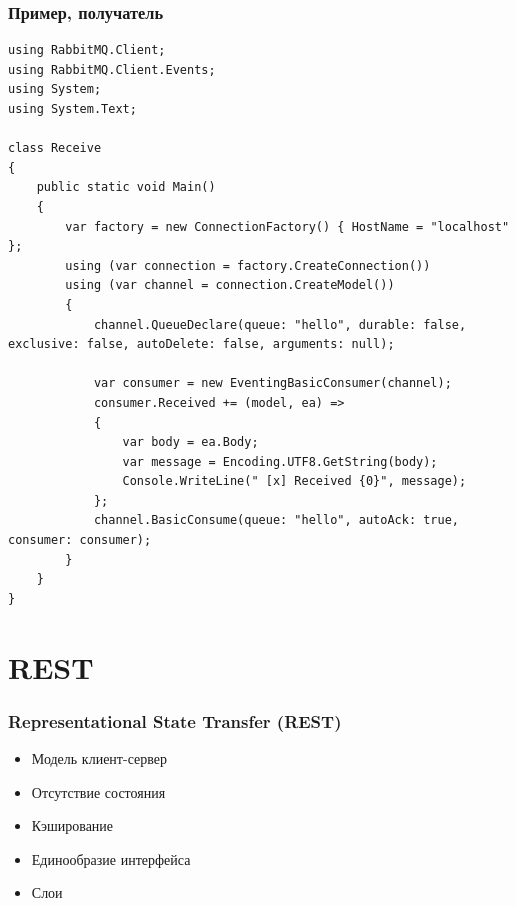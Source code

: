 \documentclass[xetex,mathserif,serif]{beamer}
\begin{document}
    \begin{frame}[fragile]
        \frametitle{Пример, получатель}
        \begin{ssmall}
            \begin{verbatim}
using RabbitMQ.Client;
using RabbitMQ.Client.Events;
using System;
using System.Text;

class Receive
{
    public static void Main()
    {
        var factory = new ConnectionFactory() { HostName = "localhost" };
        using (var connection = factory.CreateConnection())
        using (var channel = connection.CreateModel())
        {
            channel.QueueDeclare(queue: "hello", durable: false, exclusive: false, autoDelete: false, arguments: null);

            var consumer = new EventingBasicConsumer(channel);
            consumer.Received += (model, ea) =>
            {
                var body = ea.Body;
                var message = Encoding.UTF8.GetString(body);
                Console.WriteLine(" [x] Received {0}", message);
            };
            channel.BasicConsume(queue: "hello", autoAck: true, consumer: consumer);
        }
    }
}
            \end{verbatim}
        \end{ssmall}
    \end{frame}

    \section{REST}

    \begin{frame}
        \frametitle{Representational State Transfer (REST)}
        \begin{itemize}
            \item Модель клиент-сервер
            \item Отсутствие состояния
            \item Кэширование
            \item Единообразие интерфейса
            \item Слои
        \end{itemize}
    \end{frame}
\end{document}
